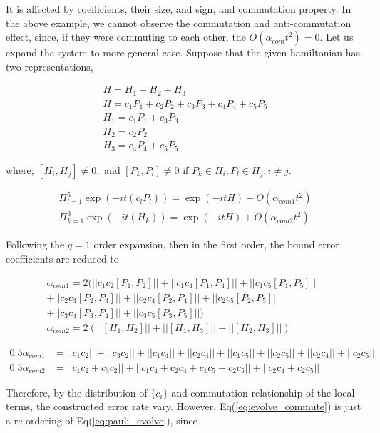 \documentclass[a4paper,12pt]{article}
\begin{document}
It is affected by coefficients, their size, and sign, and commutation property.
In the above example, we cannot observe the commutation and anti-commutation
effect, since, if they were commuting to each other, the $O(\alpha_{com} t^2) = 0$.
Let us expand the system to more general case.
Suppose that the given hamiltonian has two representations,

\begin{align}
    H = H_1 + H_2 + H_3  \\
    H =  c_1 P_1 + c_2 P_2 + c_3 P_3 + c_4 P_4 + c_5 P_5\\
    H_1 = c_1 P_1 + c_3 P_3 \\
    H_2 = c_2 P_2\\
    H_3 = c_4 P_4 + c_5 P_5
\end{align}

where, $[H_i, H_j] \neq 0,$ and 
$[P_k, P_l] \neq 0$ if $P_k \in H_i, P_l \in H_j, i \neq j$.

\begin{align}
    \Pi_{l=1}^5 \exp(- i t (c_l P_l)) = \exp(-it H) + O(\alpha_{com 1} t^2)\label{eq:pauli_evolve}\\
    \Pi_{k=1}^3 \exp(- i t (H_k)) = \exp(-it H) + O(\alpha_{com 2} t^2) \label{eq:evolve_commute}
\end{align}

Following the $q=1$ order expansion, then in the first order, the bound error 
coefficients are reduced to 

\begin{align}
    \alpha_{com1} = 2(|| c_1 c_2 [P_1, P_2]|| + || c_1 c_4 [P_1, P_4]|| + || c_1 c_5 [P_1, P_5]||& \\
    + || c_2 c_3 [P_2, P_3]|| + || c_2 c_4 [P_2, P_4]|| + || c_2 c_5 [P_2, P_5]||& \\
    + || c_3 c_4 [P_3, P_4]|| + || c_3 c_5 [P_3, P_5]||)&\\
    \alpha_{com2} = 2(|| [H_1, H_2]|| + || [H_1, H_3]|| + || [H_2, H_3]||)& 
\end{align}


\begin{align}
    0.5 \alpha_{com1} &= ||c_1 c_2|| + ||c_3 c_2|| + ||c_1 c_4|| + ||c_2 c_4|| + ||c_1 c_5|| + ||c_2 c_5||  + ||c_2 c_4|| + ||c_2 c_5||\\
    0.5 \alpha_{com2} &= ||c_1 c_2 + c_3 c_2|| + ||c_1 c_4 + c_2 c_4 + c_1 c_5 + c_2 c_5||  + ||c_2 c_4 + c_2 c_5||
\end{align}


Therefore, by the distribution of $\{c_i\}$ and commutation relationship of the local terms,
the constructed error rate vary.
However, Eq(\ref{eq:evolve_commute}) is just a re-ordering of Eq(\ref{eq:pauli_evolve}), since 
\end{document}
